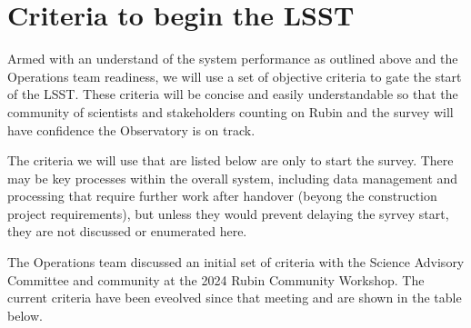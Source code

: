 \section{Criteria to begin the LSST}

Armed with an understand of the system performance as outlined above and the Operations team readiness, we will use a set of objective criteria to gate the start of the LSST. These criteria will be concise and easily understandable so that the community of scientists and stakeholders counting on Rubin and the survey will have confidence the Observatory is on track.

The criteria we will use that are listed below are only to start the survey. There may be key processes within the overall system, including data management and processing that require further work after handover (beyong the construction project requirements), but unless they would prevent delaying the syrvey start, they are not discussed or enumerated here.

The Operations team discussed an initial set of criteria with the Science Advisory Committee and community at the 2024 Rubin Community Workshop. The current criteria have been eveolved since that meeting and are shown in the table below.

